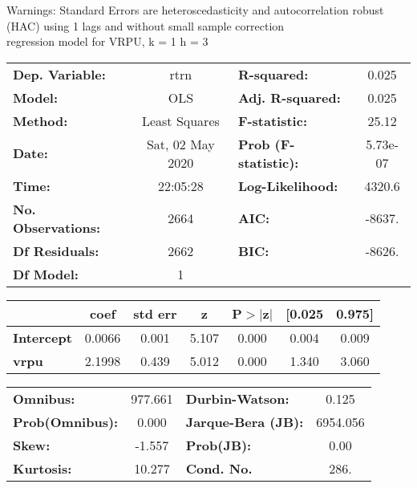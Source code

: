 Warnings: \newline
 [1] Standard Errors are heteroscedasticity and autocorrelation robust (HAC) using 1 lags and without small sample correction\\ 

regression model for VRPU, k = 1 h = 3\begin{center}
\begin{tabular}{lclc}
\toprule
\textbf{Dep. Variable:}    &       rtrn       & \textbf{  R-squared:         } &     0.025   \\
\textbf{Model:}            &       OLS        & \textbf{  Adj. R-squared:    } &     0.025   \\
\textbf{Method:}           &  Least Squares   & \textbf{  F-statistic:       } &     25.12   \\
\textbf{Date:}             & Sat, 02 May 2020 & \textbf{  Prob (F-statistic):} &  5.73e-07   \\
\textbf{Time:}             &     22:05:28     & \textbf{  Log-Likelihood:    } &    4320.6   \\
\textbf{No. Observations:} &        2664      & \textbf{  AIC:               } &    -8637.   \\
\textbf{Df Residuals:}     &        2662      & \textbf{  BIC:               } &    -8626.   \\
\textbf{Df Model:}         &           1      & \textbf{                     } &             \\
\bottomrule
\end{tabular}
\begin{tabular}{lcccccc}
                   & \textbf{coef} & \textbf{std err} & \textbf{z} & \textbf{P$> |$z$|$} & \textbf{[0.025} & \textbf{0.975]}  \\
\midrule
\textbf{Intercept} &       0.0066  &        0.001     &     5.107  &         0.000        &        0.004    &        0.009     \\
\textbf{vrpu}      &       2.1998  &        0.439     &     5.012  &         0.000        &        1.340    &        3.060     \\
\bottomrule
\end{tabular}
\begin{tabular}{lclc}
\textbf{Omnibus:}       & 977.661 & \textbf{  Durbin-Watson:     } &    0.125  \\
\textbf{Prob(Omnibus):} &   0.000 & \textbf{  Jarque-Bera (JB):  } & 6954.056  \\
\textbf{Skew:}          &  -1.557 & \textbf{  Prob(JB):          } &     0.00  \\
\textbf{Kurtosis:}      &  10.277 & \textbf{  Cond. No.          } &     286.  \\
\bottomrule
\end{tabular}
\end{center}

